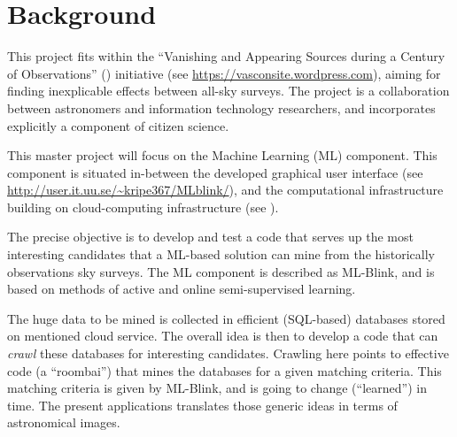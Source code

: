 \section{Background} \label{background}

This project fits within the ``Vanishing and Appearing Sources during a Century of Observations'' (\vasco) initiative (see \url{https://vasconsite.wordpress.com}), aiming for finding inexplicable effects between all-sky surveys. The \vasco project is a collaboration between astronomers and information technology researchers, and incorporates explicitly a component of citizen science.

This master project will focus on the Machine Learning (ML) component. This component is situated in-between the developed graphical user interface (see \url{http://user.it.uu.se/~kripe367/MLblink/}), and the computational infrastructure building on cloud-computing infrastructure (see ).

The precise objective is to develop and test a code that serves up the most interesting candidates that a ML-based solution can mine from the historically observations sky surveys. The ML component is described as ML-Blink, and is based on methods of active and online semi-supervised learning.

The huge data to be mined is collected in efficient (SQL-based) databases stored on mentioned cloud service. The overall idea is then to develop a code that can {\em crawl} these databases for interesting candidates. Crawling here points to effective code (a ``roombai'') that mines the databases for a given matching criteria. This matching criteria is given by ML-Blink, and is going to change (``learned'') in time. The present applications translates those generic ideas in terms of astronomical images.